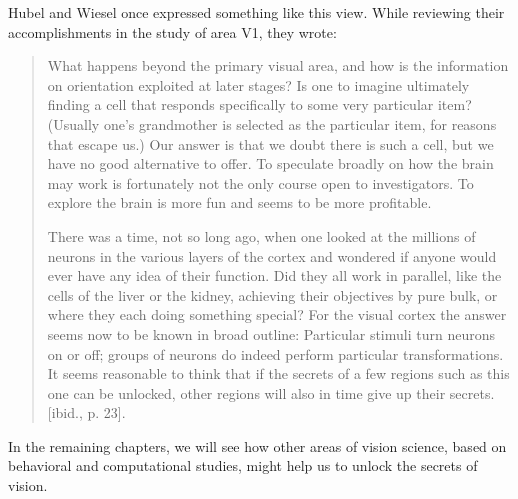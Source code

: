 Hubel and Wiesel once expressed something like this view.
While reviewing their accomplishments in the study of area V1,
they wrote:
\begin{quote}
What happens beyond the primary visual area, and how is the
information on orientation exploited at later stages?  Is one to
imagine ultimately finding a cell that responds specifically to some
very particular item?  (Usually one's grandmother is selected as the
particular item, for reasons that escape us.)  Our answer is that we
doubt there is such a cell, but we have no good alternative to offer.
To speculate broadly on how the brain may work is fortunately not the
only course open to investigators.  To explore the brain is more fun
and seems to be more profitable.

There was a time, not so long ago, when one looked at the millions of
neurons in the various layers of the cortex and wondered if anyone
would ever have any idea of their function.  Did they all work in
parallel, like the cells of the liver or the kidney, achieving their
objectives by pure bulk, or where they each doing something special?
For the visual cortex the answer seems now to be known in broad
outline:  Particular stimuli turn neurons on or off;  groups of
neurons do indeed perform particular transformations.  It seems
reasonable to think that if the secrets of a few regions such as this
one can be unlocked, other regions will also in time give up their secrets.
[ibid., p. 23].
\end{quote}

In the remaining chapters, we will see how other areas of
vision science, based on behavioral and computational studies,
might help us to unlock the secrets of vision.
